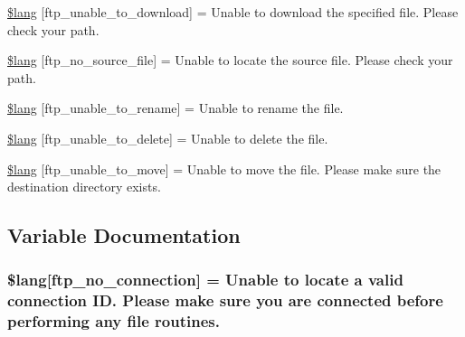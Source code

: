 \begin{DoxyCompactItemize}
\item 
\hyperlink{_admin_2system_2language_2english_2ftp__lang_8php_a65fa9f8b6a3da91390b36721c2a9775b}{\$lang} \mbox{[}\textquotesingle{}ftp\+\_\+unable\+\_\+to\+\_\+download\textquotesingle{}\mbox{]} = \textquotesingle{}Unable to download the specified file. Please check your path.\textquotesingle{}
\item 
\hyperlink{_admin_2system_2language_2english_2ftp__lang_8php_abf3e74ee1af13c9b0f0cc63fbb9081f1}{\$lang} \mbox{[}\textquotesingle{}ftp\+\_\+no\+\_\+source\+\_\+file\textquotesingle{}\mbox{]} = \textquotesingle{}Unable to locate the source file. Please check your path.\textquotesingle{}
\item 
\hyperlink{_admin_2system_2language_2english_2ftp__lang_8php_ae2715b036a8015f4da2841c15ab8db79}{\$lang} \mbox{[}\textquotesingle{}ftp\+\_\+unable\+\_\+to\+\_\+rename\textquotesingle{}\mbox{]} = \textquotesingle{}Unable to rename the file.\textquotesingle{}
\item 
\hyperlink{_admin_2system_2language_2english_2ftp__lang_8php_a922b1d7a3667e2cacb0873788e548dca}{\$lang} \mbox{[}\textquotesingle{}ftp\+\_\+unable\+\_\+to\+\_\+delete\textquotesingle{}\mbox{]} = \textquotesingle{}Unable to delete the file.\textquotesingle{}
\item 
\hyperlink{_admin_2system_2language_2english_2ftp__lang_8php_a72178091982e6697b12337601213fa76}{\$lang} \mbox{[}\textquotesingle{}ftp\+\_\+unable\+\_\+to\+\_\+move\textquotesingle{}\mbox{]} = \textquotesingle{}Unable to move the file. Please make sure the destination directory exists.\textquotesingle{}
\end{DoxyCompactItemize}


\subsection{Variable Documentation}
\hypertarget{_admin_2system_2language_2english_2ftp__lang_8php_a8630404f8e0c3750f8d997f35622b6eb}{}
\subsubsection[{\$lang}]{\setlength{\rightskip}{0pt plus 5cm}\$lang\mbox{[}\textquotesingle{}ftp\+\_\+no\+\_\+connection\textquotesingle{}\mbox{]} = \textquotesingle{}Unable to locate {\bf a} valid connection I\+D. Please make sure you are connected before performing any file routines.\textquotesingle{}}\label{_admin_2system_2language_2english_2ftp__lang_8php_a8630404f8e0c3750f8d997f35622b6eb}
\hypertarget{_admin_2system_2language_2english_2ftp__lang_8php_a57d51cf019dd2e380b84c6e31cda0cf5}{}

